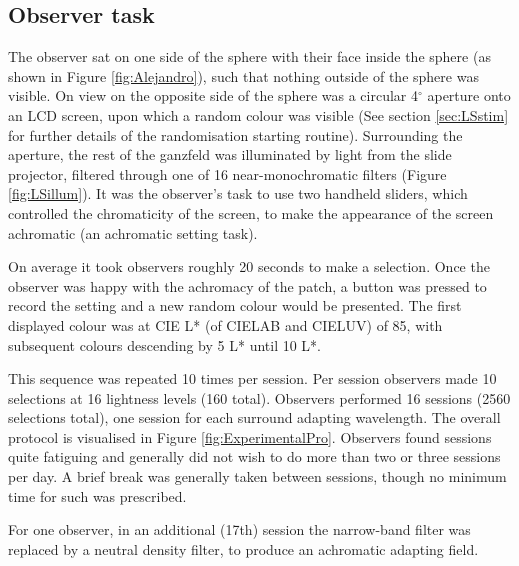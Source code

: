 \subsection{Observer task}

The observer sat on one side of the sphere with their face inside the sphere (as shown in Figure \ref{fig:Alejandro}), such that nothing outside of the sphere was visible. On view on the opposite side of the sphere was a circular 4$^{\circ}$ aperture onto an LCD screen, upon which a random colour was visible (See section \ref{sec:LSstim} for further details of the randomisation starting routine). Surrounding the aperture, the rest of the ganzfeld was illuminated by light from the slide projector, filtered through one of 16 near-monochromatic filters (Figure \ref{fig:LSillum}). It was the observer's task to use two handheld sliders, which controlled the chromaticity of the screen, to make the appearance of the screen achromatic (an achromatic setting task). 

On average it took observers roughly 20 seconds to make a selection. Once the observer was happy with the achromacy of the patch, a button was pressed to record the setting and a new random colour would be presented. The first displayed colour was at \gls{CIE} L* (of CIELAB and CIELUV) of 85, with subsequent colours descending by 5 L* until 10 L*. 

This sequence was repeated 10 times per session. Per session observers made 10 selections at 16 lightness levels (160 total). Observers performed 16 sessions (2560 selections total), one session for each surround adapting wavelength. The overall protocol is visualised in Figure \ref{fig:ExperimentalPro}. Observers found sessions quite fatiguing and generally did not wish to do more than two or three sessions per day. A brief break was generally taken between sessions, though no minimum time for such was prescribed.

For one observer, in an additional (17th) session the narrow-band filter was replaced by a neutral density filter, to produce an achromatic adapting field.

